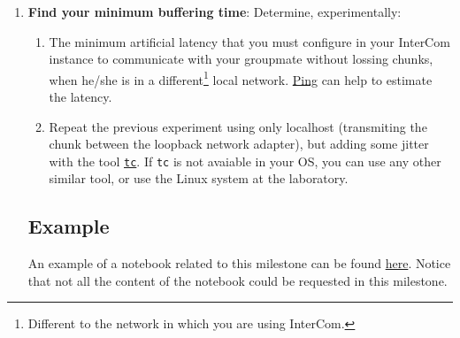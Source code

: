\begin{enumerate}

\item \textbf{Find your minimum buffering time}:
Determine, experimentally:
\begin{enumerate}
\item The minimum artificial latency that you must configure in your
  InterCom instance to communicate with your groupmate without lossing
  chunks, when he/she is in a different\footnote{Different to the
    network in which you are using InterCom.} local
  network. \href{https://vicente-gonzalez-ruiz.github.io/about_ping/}{Ping}
  can help to estimate the latency.
\item Repeat the previous experiment using only localhost (transmiting
  the chunk between the loopback network adapter), but adding some
  jitter with the tool
  \href{https://vicente-gonzalez-ruiz.github.io/about_tc/}{\texttt{tc}}. If
  \texttt{tc} is not avaiable in your OS, you can use any other
  similar tool, or use the Linux system at the laboratory.
\end{enumerate}

\subsection*{Example}
An example of a notebook related to this milestone can be found
\href{https://github.com/Tecnologias-multimedia/InterCom/blob/master/docs/Hidding_the_Network_Jitter__example.ipynb}{here}. Notice
that not all the content of the notebook could be requested in this
milestone.


\end{enumerate}
